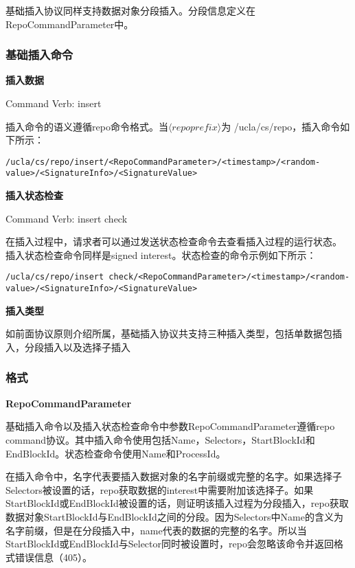 基础插入协议同样支持数据对象分段插入。分段信息定义在RepoCommandParameter中。

\subsubsection{基础插入命令}

\textbf{插入数据}

Command Verb: insert

插入命令的语义遵循repo命令格式。当$\langle repo prefix\rangle$为 /ucla/cs/repo，插入命令如下所示：

\begin{framed}
\begin{scriptsize}
\begin{verbatim}
/ucla/cs/repo/insert/<RepoCommandParameter>/<timestamp>/<random-value>/<SignatureInfo>/<SignatureValue>
\end{verbatim}
\end{scriptsize}
\end{framed}

\textbf{插入状态检查}

Command Verb: insert check

在插入过程中，请求者可以通过发送状态检查命令去查看插入过程的运行状态。 插入状态检查命令同样是signed interest。状态检查的命令示例如下所示：

\begin{framed}
\begin{tiny}
\begin{verbatim}
/ucla/cs/repo/insert check/<RepoCommandParameter>/<timestamp>/<random-value>/<SignatureInfo>/<SignatureValue>
\end{verbatim}
\end{tiny}
\end{framed}

\textbf{插入类型}

如前面协议原则介绍所属，基础插入协议共支持三种插入类型，包括单数据包插入，分段插入以及选择子插入

\subsubsection{格式}
\textbf{RepoCommandParameter}

基础插入命令以及插入状态检查命令中参数RepoCommandParameter遵循repo command协议。其中插入命令使用包括Name，Selectors，StartBlockId和EndBlockId。状态检查命令使用Name和ProcessId。

在插入命令中，名字代表要插入数据对象的名字前缀或完整的名字。如果选择子Selectors被设置的话，repo获取数据的interest中需要附加该选择子。如果StartBlockId或EndBlockId被设置的话，则证明该插入过程为分段插入，repo获取数据对象StartBlockId与EndBlockId之间的分段。因为Selectors中Name的含义为名字前缀，但是在分段插入中，name代表的数据的完整的名字。所以当StartBlockId或EndBlockId与Selector同时被设置时，repo会忽略该命令并返回格式错误信息（405）。

